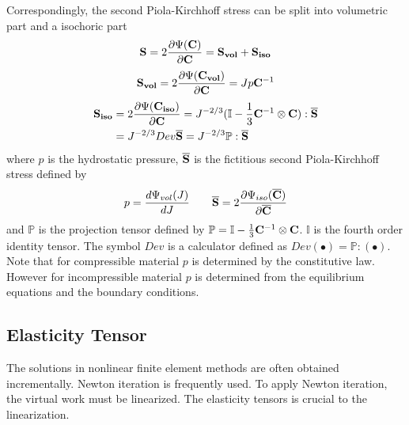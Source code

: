 Correspondingly, the second Piola-Kirchhoff stress can be split into volumetric part and a isochoric part
\begin{equation}
\bold{S} =  2\frac{\partial{\Psi({\bold{C})}}}{\partial{\bold{C}}} = \bold{S_{vol}}  + \bold{S_{iso}} 
\end{equation}
\begin{equation} \label{Svol}
\bold{S_{vol}} = 2\frac{\partial{\Psi({\bold{C_{vol}})}}}{\partial{\bold{C}}} = Jp{\bold{C}} ^{-1}
\end{equation}
\begin{equation} \label{Siso}
\begin{split}
\bold{S_{iso}} & = 2\frac{\partial{\Psi({\bold{C_{iso}})}}}{\partial{\bold{C}}} = J^{-2/3}(\mathbb{I} - \frac{1}{3}\bold{C}^{-1} \otimes \bold{C}):\overline{\bold{S}} \\
&  = J^{-2/3}Dev\overline{\bold{S}} = J^{-2/3}\mathbb{P}:\overline{\bold{S}}
\end{split}
\end{equation}
where $p$ is the hydrostatic pressure, $\overline{\bold{S}}$ is the fictitious second Piola-Kirchhoff stress defined by
\begin{equation}
p = \frac{d\Psi_{vol}(J)}{dJ}
\qquad
\overline{\bold{S}} = 2\frac{\partial\Psi_{iso}({\overline{\bold{C}})}}{\partial\overline{\bold{C}}}
\end{equation}
and $\mathbb{P}$ is the projection tensor defined by $\mathbb{P} = \mathbb{I} - \frac{1}{3}\bold{C}^{-1} \otimes \bold{C} $. $\mathbb{I}$ is the fourth order identity tensor. The symbol $Dev$ is a calculator defined as $Dev(\bullet) = \mathbb{P}:(\bullet)$.
Note that for compressible material $p$ is determined by the constitutive law. However for incompressible material $p$ is determined from the equilibrium equations and the boundary conditions. 


\subsection{Elasticity Tensor}
The solutions in nonlinear finite element methods are often obtained incrementally. Newton iteration is frequently used. To apply Newton iteration, the virtual work must be linearized. The elasticity tensors is crucial to the linearization.

